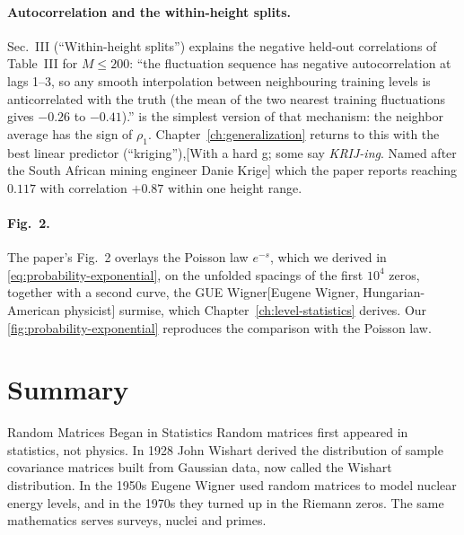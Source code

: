 \paragraph{Autocorrelation and the within-height splits.} Sec.~III (``Within-height splits'') explains the negative held-out correlations of Table~III for $M\le200$: ``the fluctuation sequence has negative autocorrelation at lags 1--3, so any smooth interpolation between neighbouring training levels is anticorrelated with the truth (the mean of the two nearest training fluctuations gives $-0.26$ to $-0.41$).''  is the simplest version of that mechanism: the neighbor average has the sign of $\rho_1$. Chapter~\ref{ch:generalization} returns to this with the best linear predictor (``kriging''),[With a hard g; some say \emph{KRIJ-ing}. Named after the South African mining engineer Danie Krige] which the paper reports reaching $0.117$ with correlation $+0.87$ within one height range.

\paragraph{Fig.~2.} The paper's Fig.~2 overlays the Poisson law $e^{-s}$, which we derived in \cref{eq:probability-exponential}, on the unfolded spacings of the first $10^4$ zeros, together with a second curve, the GUE Wigner[Eugene Wigner, Hungarian-American physicist] surmise, which Chapter~\ref{ch:level-statistics} derives. Our \cref{fig:probability-exponential} reproduces the comparison with the Poisson law.

\section{Summary}
\begin{didyouknow}{Random Matrices Began in Statistics}
Random matrices first appeared in statistics, not physics. In 1928 John Wishart derived the distribution of sample covariance matrices built from Gaussian data, now called the Wishart distribution. In the 1950s Eugene Wigner used random matrices to model nuclear energy levels, and in the 1970s they turned up in the Riemann zeros. The same mathematics serves surveys, nuclei and primes.
\end{didyouknow}

